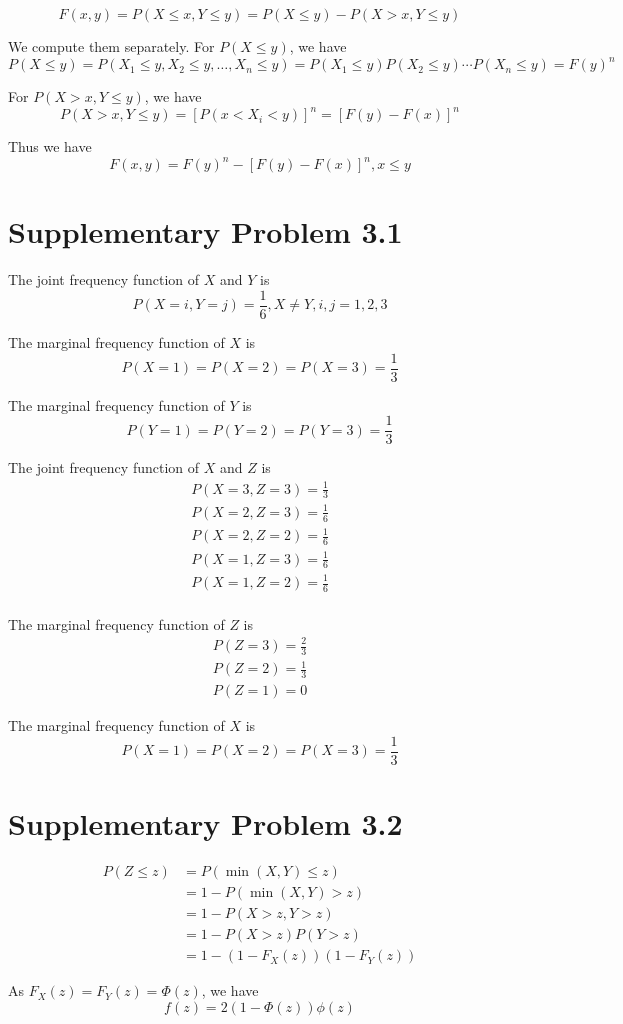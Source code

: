 \documentclass[a4paper, UTF-8]{article}
\theoremstyle{plain}
\begin{document}
$$
F(x, y) = P(X \leq x, Y \leq y) = P(X \leq y) - P(X > x, Y \leq y)
$$

We compute them separately. For $P(X \leq y)$, we have
$$
P(X \leq y) = P(X_1 \leq y, X_2 \leq y, \ldots, X_n \leq y) = P(X_1 \leq y)P(X_2 \leq y) \cdots P(X_n \leq y) = F(y)^n
$$

For $P(X > x, Y \leq y)$, we have
$$
P(X > x, Y \leq y) = [P(x < X_i < y)]^n = [F(y) - F(x)]^n
$$

Thus we have
$$
F(x, y) = F(y)^n - [F(y) - F(x)]^n, x \leq y
$$

\section{Supplementary Problem 3.1} 

The joint frequency function of $X$ and $Y$ is
$$
P(X = i, Y = j) = \frac{1}{6}, X \ne Y, i, j = 1, 2, 3
$$

The marginal frequency function of $X$ is
$$
P(X = 1) = P(X = 2) = P(X = 3) = \frac{1}{3}
$$

The marginal frequency function of $Y$ is
$$
P(Y = 1) = P(Y = 2) = P(Y = 3) = \frac{1}{3}
$$

The joint frequency function of $X$ and $Z$ is 
\begin{align*} 
P(X = 3, Z = 3) = \frac{1}{3} \\ 
P(X = 2, Z = 3) = \frac{1}{6} \\
P(X = 2, Z = 2) = \frac{1}{6} \\ 
P(X = 1, Z = 3) = \frac{1}{6} \\ 
P(X = 1, Z = 2) = \frac{1}{6} \\
\end{align*} 

The marginal frequency function of $Z$ is
\begin{align*}
P(Z = 3) = \frac{2}{3} \\
P(Z = 2) = \frac{1}{3} \\
P(Z = 1) = 0
\end{align*}

The marginal frequency function of $X$ is
$$
P(X = 1) = P(X = 2) = P(X = 3) = \frac{1}{3}
$$
  
\section{Supplementary Problem 3.2} 

\begin{align*}
P(Z \leq z) &= P(\min(X,Y) \leq z) \\ 
&= 1 - P(\min(X,Y) > z)  \\ 
&= 1 - P(X > z, Y > z) \\ 
&= 1 - P(X > z)P(Y > z)  \\ 
&= 1 - (1 - F_X(z))(1 - F_Y(z))
\end{align*}

As $F_X(z)= F_Y(z) = \Phi(z)$, we have 
$$
f(z) = 2(1 - \Phi(z))\phi(z)
$$
\end{document}
